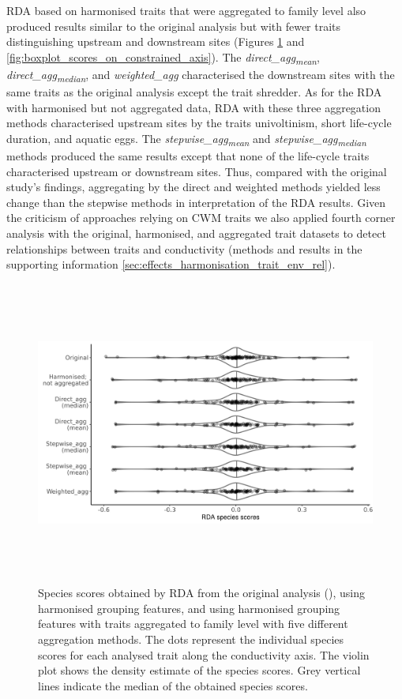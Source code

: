 \documentclass[12pt]{article}
\begin{document}
RDA based on harmonised traits that were aggregated to family level also produced results similar to the original analysis but with fewer traits distinguishing upstream and downstream sites (Figures \ref{fig:violin_plot_species_sc} and \ref{fig:boxplot_scores_on_constrained_axis}). The \textit{direct\_agg\textsubscript{mean}}, \textit{direct\_agg\textsubscript{median}}, and \textit{weighted\_agg} characterised the downstream sites with the same traits as the original analysis except the trait shredder. As for the RDA with harmonised but not aggregated data, RDA with these three aggregation methods characterised upstream sites by the traits univoltinism, short life-cycle duration, and aquatic eggs. The \textit{stepwise\_agg\textsubscript{mean}} and \textit{stepwise\_agg\textsubscript{median}} methods produced the same results except that none of the life-cycle traits characterised upstream or downstream sites. Thus, compared with the original study’s findings, aggregating by the direct and weighted methods yielded less change than the stepwise methods in interpretation of the RDA results. Given the criticism of approaches relying on CWM traits we also applied fourth corner analysis with the original, harmonised, and aggregated trait datasets to detect relationships between traits and conductivity (methods and results in the supporting information \ref{sec:effects_harmonisation_trait_env_rel}).

\begin{figure}[H]
    \centering
    \includegraphics[width=16.5cm, height=10cm]{Species_scores_rda.png}
    \caption{Species scores obtained by RDA from the original analysis (\cite{szocs_effects_2014}), using harmonised grouping features, and using harmonised grouping features with traits aggregated to family level with five different aggregation methods. The dots represent the individual species scores for each analysed trait along the conductivity axis. The violin plot shows the density estimate of the species scores. Grey vertical lines indicate the median of the obtained species scores.}
    \label{fig:violin_plot_species_sc}
\end{figure}
\end{document}
